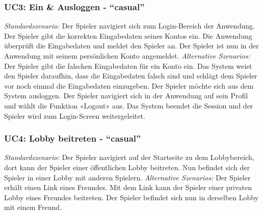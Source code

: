 \documentclass[11pt,ngerman]{article}
\newcommand{\quotes}[1]{``#1''}
\begin{document}
            \subsubsection{UC3: Ein \& Ausloggen  - \quotes{casual}}
            \label{sssec:UC3EinAusloggen}
                \begin{tcolorbox}[enhanced, breakable, sharp corners, width=\dimexpr\textwidth-15mm\relax ,enlarge left by=10mm ,fontupper=\linespread{1.1}\selectfont, boxrule=1pt, title={UC3: Ein \& Ausloggen }, colback=white, colframe=gray!22, coltitle=black]
                     \textit{Standardszenario:} Der Spieler navigiert sich zum Login-Bereich der Anwendung. Der Spieler gibt die korrekten Eingabedaten seines Kontos ein. Die Anwendung überprüft die Eingabedaten und meldet den Spieler an. Der
Spieler ist nun in der Anwendung mit seinem persönlichen Konto angemeldet.\newline
                     \newline
                     \textit{Alternative Szenarios:} \newline
                     Der Spieler gibt die falschen Eingabedaten für ein Konto ein. Das System weist den Spieler
daraufhin, dass die Eingabedaten falsch sind und schlägt dem Spieler vor noch einmal die  Eingabedaten einzugeben. \newline
                     \newline
                     Der Spieler möchte sich aus dem System ausloggen. Der Spieler navigiert sich in der Anwendung auf
sein Profil und wählt die Funktion «Logout» aus. Das System beendet die Session und der Spieler
wird zum Login-Screen weitergeleitet.
                \end{tcolorbox}

             \subsubsection{UC4: Lobby beitreten - \quotes{casual}}
             \label{sssec:UC4Lobbybeitreten}
                 \begin{tcolorbox}[enhanced, breakable, sharp corners, width=\dimexpr\textwidth-15mm\relax ,enlarge left by=10mm ,fontupper=\linespread{1.1}\selectfont, boxrule=1pt, title={UC4: Lobby beitreten }, colback=white, colframe=gray!22, coltitle=black]
                     \textit{Standardszenario:} Der Spieler navigiert auf der Startseite zu dem Lobbybereich, dort kann der Spieler einer öffentlichen Lobby beitreten. \newline
                     Nun befindet sich der Spieler in einer Lobby mit anderen Spielern.\newline
                     \newline
                     \textit{Alternative Szenarios:} \newline
                     Der Spieler erhält einen Link eines Freundes. Mit dem Link kann der Spieler einer privaten Lobby eines Freundes beitreten. \newline
                     Der Spieler befindet sich nun in derselben Lobby mit einem Freund.
                 \end{tcolorbox}
\end{document}
